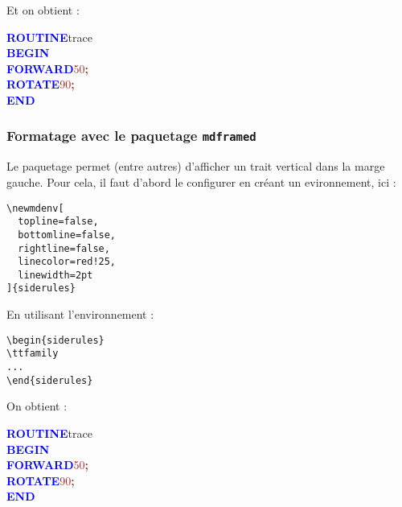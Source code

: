 Et on obtient :

\resetlinenumber
\begin{linenumbers}\singlespacing\ttfamily
\textcolor{blue}{\bf ROUTINE}\hspace*{.6em}t{}r{}a{}c{}e{} \\
\textcolor{blue}{\bf BEGIN} \\
\hspace*{1.2em}\textcolor{blue}{\bf FORWARD}\hspace*{.6em}\textcolor{brown}{5{}0{}}\textcolor{brown}{\bf ;} \\
\hspace*{1.2em}\textcolor{blue}{\bf ROTATE}\hspace*{.6em}\textcolor{brown}{9{}0{}}\textcolor{brown}{\bf ;} \\
\textcolor{blue}{\bf END}
\end{linenumbers}

\subsubsection{Formatage avec le paquetage \texttt{mdframed}}

Le paquetage  permet (entre autres) d'afficher un trait vertical dans la marge gauche. Pour cela, il faut d'abord le configurer en créant un evironnement, ici  :

\begin{verbatim}
\newmdenv[
  topline=false,
  bottomline=false,
  rightline=false,
  linecolor=red!25,
  linewidth=2pt
]{siderules}
\end{verbatim}

En utilisant l'environnement  :

\begin{verbatim}
\begin{siderules}
\ttfamily
...
\end{siderules}
\end{verbatim}

On obtient :

{

\begin{siderulesRed}
\ttfamily
\textcolor{blue}{\bf ROUTINE}\hspace*{.6em}t{}r{}a{}c{}e{} \\
\textcolor{blue}{\bf BEGIN} \\
\hspace*{1.2em}\textcolor{blue}{\bf FORWARD}\hspace*{.6em}\textcolor{brown}{5{}0{}}\textcolor{brown}{\bf ;} \\
\hspace*{1.2em}\textcolor{blue}{\bf ROTATE}\hspace*{.6em}\textcolor{brown}{9{}0{}}\textcolor{brown}{\bf ;} \\
\textcolor{blue}{\bf END}
\end{siderulesRed}
}

